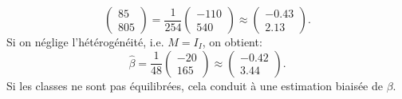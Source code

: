 \documentclass{../headers/td_upc}
\providecommand{\1}{\mathds{1}}
\begin{document}
\begin{enumerate}
{\[		\begin{pmatrix} 85 \\ 805 \end{pmatrix}
		= \frac{1}{254} \begin{pmatrix} -110 \\ 540 \end{pmatrix}
		\approx
		\begin{pmatrix} -0.43 \\ 2.13 \end{pmatrix}.
		\]
		Si on néglige l'hétérogénéité, i.e. $M = I_I$, on obtient:
		\[
		\hat \beta
		= \frac{1}{48} \begin{pmatrix} -20 \\ 165 \end{pmatrix}
		\approx
		\begin{pmatrix} -0.42 \\ 3.44 \end{pmatrix}.
		\]
		Si les classes ne sont pas équilibrées, cela conduit à une estimation
		biaisée de $\beta$.
		}
	\end{enumerate}
	
	\cor{\newpage}
\end{document}
